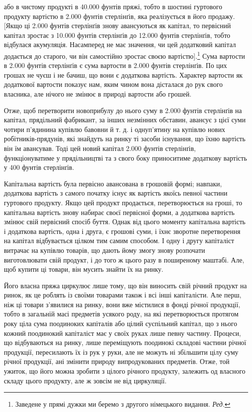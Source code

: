або в чистому продукті в 40.000 фунтів пряжі, тобто в шостині
гуртового продукту вартістю в 2.000 фунтів стерлінґів, яка
реалізується в його продажу. [Якщо ці 2.000 фунтів стерлінґів
знову авансуються як капітал, то первісний капітал зростає
з 10.000 фунтів стерлінґів до 12.000 фунтів стерлінґів, тобто
відбулася акумуляція. Насамперед не має значення, чи цей додатковий
капітал додається до старого, чи він самостійно зростає
своєю вартістю].\footnote*{
Заведене у прямі дужки ми беремо з другого німецького видання.
\emph{Ред.}
} Сума вартости в 2.000 фунтів стерлінґів є сума
вартости в 2.000 фунтів стерлінґів. По цих грошах не чуєш і не
бачиш, що вони є додаткова вартість. Характер вартости як додаткової
вартости показує нам, яким чином вона дісталася до
рук свого власника, але нічого не змінює в природі вартости
або грошей.

Отже, щоб перетворити новоприбулу до нього суму в 2.000 фунтів
стерлінґів на капітал, прядільний фабрикант, за інших незмінних
обставин, авансує з цієї суми чотири п’ядинина купівлю
бавовни й т. д. і однуп’ятину на купівлю нових робітників-прядунів,
які знайдуть на ринку ті засоби існування, що їхню вартість
він їм авансував. Тоді цей новий капітал 2.000 фунтів
стерлінґів, функціонуватиме у прядільництві та з свого боку
приноситиме додаткову вартість у 400 фунтів стерлінґів.

Капітальна вартість була первісно авансована в грошовій
формі; навпаки, додаткова вартість з самого початку існує як
вартість якоїсь певної частини гуртового продукту. Якщо цей
продукт продається, перетворюється на гроші, то капітальна
вартість знову набирає своєї первісної форми, а додаткова вартість
змінює свій первісний спосіб буття. Однак від цього моменту
капітальна вартість і додаткова вартість, одна і друга, є грошові
суми, і їхнє зворотне перетворення на капітал відбувається цілком
тим самим способом. І одну і другу капіталіст витрачає на
купівлю товарів, що дають йому змогу знову розпочати виготовлювати
свій продукт, і до того ж цього разу в поширеному
маштабі. Але, щоб купити ці товари, він мусить знайти їх на ринку.

Його власна пряжа циркулює лише тому, що він виносить
свій річний продукт на ринок, як це роблять із своїми товарами
також і всі інші капіталісти. Але перш, ніж ці товари з’явилися
на ринку, вони вже містилися в фонді річної продукції, тобто в
загальній масі предметів усякого роду, на які перетворюється
протягом року ціла сума поодиноких капіталів або цілий суспільний
капітал, що з нього кожний поодинокий капіталіст має
у своїх руках лише певну частину. Процеси, що відбуваються на
ринку, лише переміщують поодинокі складові частини річної
продукції, пересилають їх із рук у руки, але не можуть ні збільшити
цілу суму річної продукції, ані змінити природу випродукованих
предметів. Отже, той ужиток, що його можна зробити
з цілого річного продукту, залежить од власного складу цього
продукту, але ж зовсім не від циркуляції.